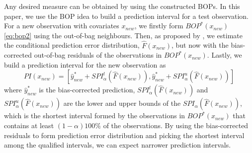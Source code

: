 Any desired measure can be obtained by using the constructed BOPs. In this paper, we use the BOP idea to build a prediction interval for a test observation. For a new observation with covariates $x_{new}$, we firstly form $BOP^{*}\left(x_{new}\right)$ \eqref{eq:bop2} using the out-of-bag neighbours. Then, as proposed by \citet{lu_unified_2021}, we estimate the conditional prediction error distribution, $\hat{F}\left(x_{new}\right)$, but now with the bias-corrected out-of-bag residuals of the observations in $BOP^{*}\left(x_{new}\right)$. Lastly, we build a prediction interval for the new observation as
\begin{equation}
    PI\left(x_{new}\right) = \left[\hat y^{*}_{new} + SPI^l_{\alpha}\left(\hat{F}\left(x_{new}\right)\right), \hat y^{*}_{new} + SPI^u_{\alpha}\left(\hat{F}\left(x_{new}\right)\right)\right]
\end{equation}
where $\hat y^{*}_{new}$ is the bias-corrected prediction, $SPI^l_{\alpha}\left(\hat{F}\left(x_{new}\right)\right)$ and $SPI^u_{\alpha}\left(\hat{F}\left(x_{new}\right)\right)$ are the lower and upper bounds of the $SPI_{\alpha}\left(\hat{F}\left(x_{new}\right)\right)$, which is the shortest interval formed by the observations in $BOP^{*}\left(x_{new}\right)$ that contains at least $\left(1-\alpha\right)100\%$ of the observations. By using the bias-corrected residuals to form prediction error distribution and picking the shortest interval among the qualified intervals, we can expect narrower prediction intervals. 

